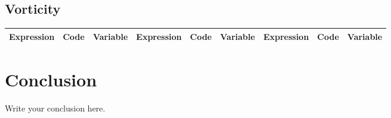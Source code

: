 \documentclass[10pt, letterpaper]{article}
\begin{document}
\subsection{Vorticity}
\begin{table}
\centering
\begin{tabular}{|ccc||ccc||ccc|}
\hline
Expression & Code & Variable & Expression & Code & Variable & Expression & Code & Variable \\
\hline

\hline
\end{tabular}
\end{table}
\section{Conclusion}
Write your conclusion here.
\end{document}

